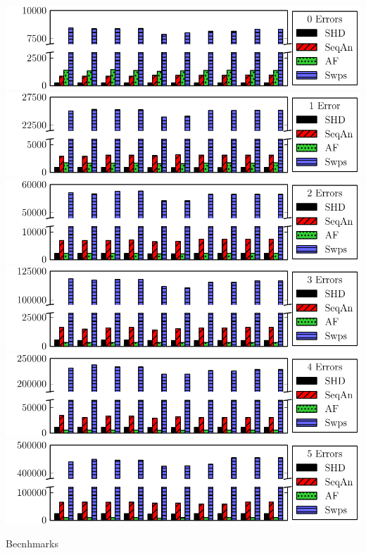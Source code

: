 \documentclass[12pt]{standalone}
\begin{document}
\large
\pagestyle{empty}
\begin{minipage}{17.75cm}
\noindent
\includegraphics{0_errors.pdf}\break
\noindent
\vspace{-.65cm}\break
\includegraphics{1_errors.pdf}\break
\noindent
\vspace{-.65cm}\break
\includegraphics{2_errors.pdf}\break
\noindent
\vspace{-.65cm}\break
\includegraphics{3_errors.pdf}\break
\noindent
\vspace{-.65cm}\break
\includegraphics{4_errors.pdf}\break
\noindent
\vspace{-.65cm}\break
\includegraphics{5_errors.pdf}
\noindent
{}
\vspace{-1.1cm}
\begin{center} \parbox{4.75cm}{\small Becnhmarks} \end{center}
\end{minipage}
\end{document}
